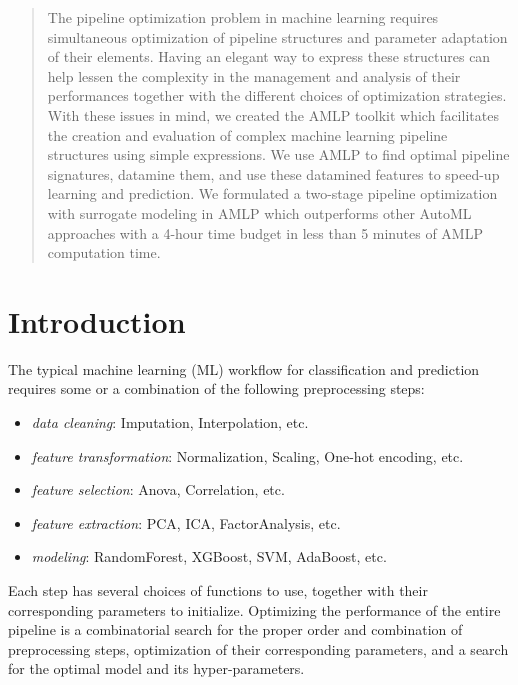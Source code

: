 \documentclass{juliacon}
\begin{document}


\maketitle

\begin{abstract}
 The pipeline optimization problem in machine learning requires simultaneous
  optimization of pipeline structures and parameter adaptation of their
  elements. Having an elegant way to express these structures can help lessen
  the complexity in the management and analysis of their performances together
  with the different choices of optimization strategies. With these issues in
  mind, we created the AMLP toolkit which facilitates the creation and
  evaluation of complex machine learning pipeline structures using simple
  expressions.  We use AMLP to find optimal pipeline signatures, 
  datamine them, and use these datamined features to speed-up learning
  and prediction. We formulated a two-stage pipeline optimization 
  with surrogate modeling in AMLP which outperforms other AutoML 
  approaches with a 4-hour time budget in less than 5 minutes of AMLP
  computation time. 
\end{abstract}

\section{Introduction}
\label{intro}

The typical machine learning (ML) workflow for classification and prediction
requires some or a combination of the following preprocessing steps:
\begin{itemize}
\item \emph{data cleaning}: Imputation, Interpolation, etc.
\item \emph{feature transformation}: Normalization, Scaling, One-hot encoding, etc.
\item \emph{feature selection}: Anova, Correlation, etc.
\item \emph{feature extraction}: PCA, ICA, FactorAnalysis, etc.
\item \emph{modeling}: RandomForest, XGBoost, SVM, AdaBoost, etc.
\end{itemize}

Each step has several choices of functions to use, together with their
corresponding parameters to initialize. Optimizing the performance of the
entire pipeline is a combinatorial search for the proper order and combination
of preprocessing steps, optimization of their corresponding parameters,
and a search for the optimal model and its hyper-parameters.
\end{document}
